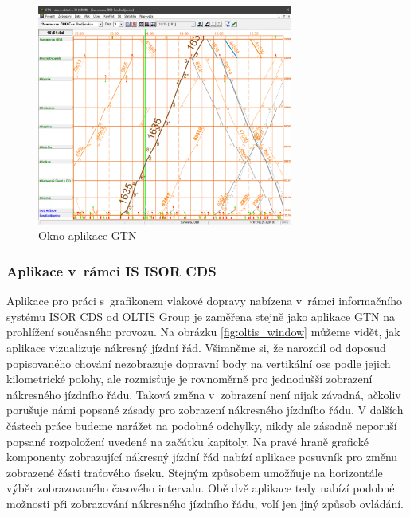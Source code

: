 \begin{figure}[!htb]
	\centering
	\includegraphics[width=0.75\textwidth]{../img/kap1_gtn_okno_interval_3h}
	\caption{Okno aplikace GTN}
	\label{fig:gtn_okno}
\end{figure}

\subsubsection*{Aplikace v~rámci IS ISOR CDS}
Aplikace pro práci s~grafikonem vlakové dopravy nabízena v~rámci informačního systému ISOR CDS \cite{ISOR_CDS} od OLTIS Group je zaměřena stejně jako aplikace GTN na prohlížení současného provozu. Na obrázku \ref{fig:oltis_window} můžeme vidět, jak aplikace vizualizuje nákresný jízdní řád. Všimněme si, že narozdíl od doposud popisovaného chování nezobrazuje dopravní body na vertikální ose podle jejich kilometrické polohy, ale rozmisťuje je rovnoměrně pro jednodušší zobrazení nákresného jízdního řádu. Taková změna v~zobrazení není nijak závadná, ačkoliv porušuje námi popsané zásady pro zobrazení nákresného jízdního řádu. V dalších částech práce budeme narážet na podobné odchylky, nikdy ale zásadně neporuší popsané rozpoložení uvedené na začátku kapitoly.
Na pravé hraně grafické komponenty zobrazující nákresný jízdní řád nabízí aplikace posuvník pro změnu zobrazené části traťového úseku. Stejným způsobem umožňuje na horizontále výběr zobrazovaného časového intervalu. Obě dvě aplikace tedy nabízí podobné možnosti při zobrazování nákresného jízdního řádu, volí jen jiný způsob ovládání.

